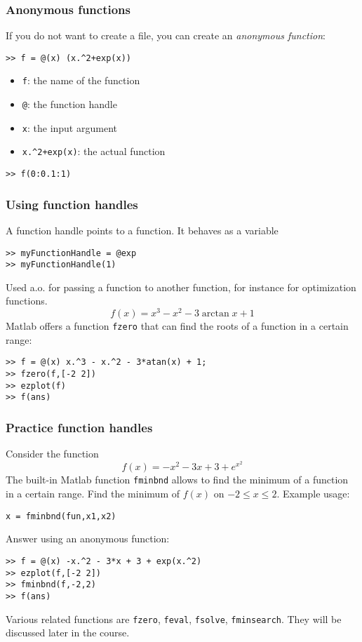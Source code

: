 \begin{frame}[fragile]
  \frametitle{Anonymous functions}
  If you do not want to create a file, you can create an \emph{anonymous function}:
  \begin{lstlisting}
>> f = @(x) (x.^2+exp(x))
  \end{lstlisting}
  \pause
  \begin{itemize}
    \item \lstinline$f$: the name of the function
    \item \lstinline$@$: the function handle
    \item \lstinline$x$: the input argument
    \item \lstinline$x.^2+exp(x)$: the actual function
  \end{itemize}\pause
  \begin{lstlisting}
>> f(0:0.1:1)   
  \end{lstlisting}
\end{frame}

\begin{frame}[fragile]
  \frametitle{Using function handles}
  A function handle points to a function. It behaves as a variable
  \begin{lstlisting}
>> myFunctionHandle = @exp 
>> myFunctionHandle(1)
  \end{lstlisting}
  \pause
  Used a.o. for passing a function to another function, for instance for optimization functions.
  \[ f(x) = x^3 -x^2 -3\arctan{x}+1 \]
  \pause
  Matlab offers a function \lstinline$fzero$ that can find the roots of a function in a certain range:
  \begin{lstlisting}
>> f = @(x) x.^3 - x.^2 - 3*atan(x) + 1;
>> fzero(f,[-2 2])
>> ezplot(f)
>> f(ans)
  \end{lstlisting}
\end{frame}

\begin{frame}[fragile]
  \frametitle{Practice function handles}
  Consider the function
  \[ f(x) = -x^2 - 3x + 3 + e^{x^2} \]
  The built-in Matlab function \lstinline$fminbnd$ allows to find the minimum of a function in a certain range. Find the minimum of $f(x)$ on $-2\leq x \leq2$.
  Example usage:
  \begin{lstlisting}
x = fminbnd(fun,x1,x2)
  \end{lstlisting}
  \pause
  Answer using an anonymous function:
  \begin{lstlisting}
>> f = @(x) -x.^2 - 3*x + 3 + exp(x.^2)
>> ezplot(f,[-2 2])
>> fminbnd(f,-2,2)
>> f(ans)
  \end{lstlisting}
  \pause
  Various related functions are \lstinline$fzero$, \lstinline$feval$, \lstinline$fsolve$, \lstinline$fminsearch$. They will be discussed later in the course.
% 
\end{frame}


